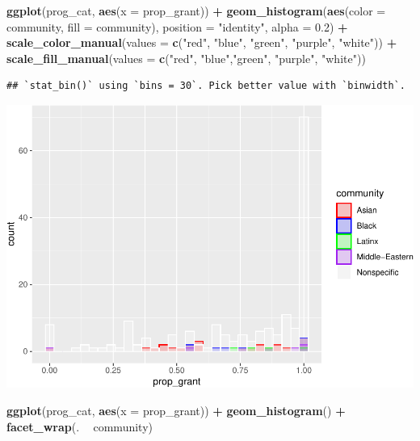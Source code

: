 \documentclass[]{article}
\newenvironment{Shaded}{\begin{snugshade}}{\end{snugshade}}
\newcommand{\DataTypeTok}[1]{\textcolor[rgb]{0.13,0.29,0.53}{#1}}
\newcommand{\FloatTok}[1]{\textcolor[rgb]{0.00,0.00,0.81}{#1}}
\newcommand{\KeywordTok}[1]{\textcolor[rgb]{0.13,0.29,0.53}{\textbf{#1}}}
\newcommand{\NormalTok}[1]{#1}
\newcommand{\OperatorTok}[1]{\textcolor[rgb]{0.81,0.36,0.00}{\textbf{#1}}}
\newcommand{\StringTok}[1]{\textcolor[rgb]{0.31,0.60,0.02}{#1}}
\begin{document}
\begin{Shaded}
\begin{Highlighting}[]
\KeywordTok{ggplot}\NormalTok{(prog_cat, }\KeywordTok{aes}\NormalTok{(}\DataTypeTok{x =}\NormalTok{ prop_grant)) }\OperatorTok{+}
\StringTok{  }\KeywordTok{geom_histogram}\NormalTok{(}\KeywordTok{aes}\NormalTok{(}\DataTypeTok{color =}\NormalTok{ community, }\DataTypeTok{fill =}\NormalTok{ community),}
                 \DataTypeTok{position =} \StringTok{"identity"}\NormalTok{, }\DataTypeTok{alpha =} \FloatTok{0.2}\NormalTok{) }\OperatorTok{+}
\StringTok{  }\KeywordTok{scale_color_manual}\NormalTok{(}\DataTypeTok{values =} \KeywordTok{c}\NormalTok{(}\StringTok{"red"}\NormalTok{, }\StringTok{"blue"}\NormalTok{, }\StringTok{"green"}\NormalTok{, }\StringTok{"purple"}\NormalTok{, }\StringTok{"white"}\NormalTok{)) }\OperatorTok{+}
\StringTok{  }\KeywordTok{scale_fill_manual}\NormalTok{(}\DataTypeTok{values =} \KeywordTok{c}\NormalTok{(}\StringTok{"red"}\NormalTok{, }\StringTok{"blue"}\NormalTok{,}\StringTok{"green"}\NormalTok{, }\StringTok{"purple"}\NormalTok{, }\StringTok{"white"}\NormalTok{))}
\end{Highlighting}
\end{Shaded}

\begin{verbatim}
## `stat_bin()` using `bins = 30`. Pick better value with `binwidth`.
\end{verbatim}

\includegraphics{sofc-funding_files/figure-latex/unnamed-chunk-6-7.pdf}

\begin{Shaded}
\begin{Highlighting}[]
\KeywordTok{ggplot}\NormalTok{(prog_cat, }\KeywordTok{aes}\NormalTok{(}\DataTypeTok{x =}\NormalTok{ prop_grant)) }\OperatorTok{+}
\StringTok{  }\KeywordTok{geom_histogram}\NormalTok{() }\OperatorTok{+}
\StringTok{  }\KeywordTok{facet_wrap}\NormalTok{(. }\OperatorTok{~}\StringTok{ }\NormalTok{community)}
\end{Highlighting}
\end{Shaded}
\end{document}
